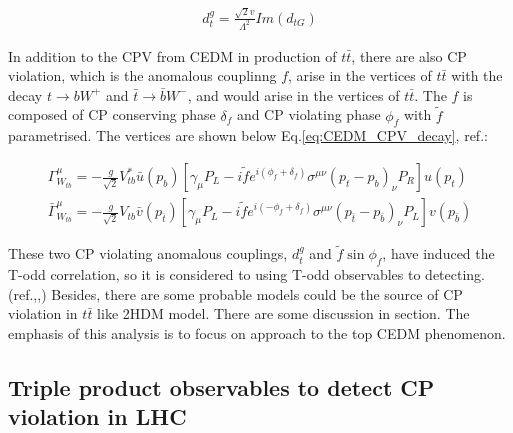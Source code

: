 	\begin{equation}
	\begin{split}
	d_t^g = \frac{\sqrt{2} v}{\Lambda^2} Im(d_{tG})
	\label{eq:CEDM_L_connection}
	\end{split}
	\end{equation}
	\FloatBarrier

	In addition to the CPV from CEDM in production of $t\bar{t}$, there are also CP violation, which is the anomalous couplinng $f$, arise in the vertices of $t\bar{t}$ with the decay $t \rightarrow bW^+$ and $\bar{t} \rightarrow \bar{b}W^-$, and would arise in the vertices of $t\bar{t}$. The $f$ is composed of CP conserving phase $\delta_f$ and CP violating phase $\phi_{f}$ with $\widetilde{f}$ parametrised. The vertices are shown below Eq.\ref{eq:CEDM_CPV_decay}, ref.\cite{PhysRevD.81.034013}:

	\begin{equation}
	\begin{split}
	\Gamma^{\mu}_{W_{tb}} = - \frac{g}{\sqrt{2}}V_{tb}^{*} \bar{u}(p_{b})[ \gamma_{\mu} P_{L} - i\widetilde{f}e^{i(\phi_f + \delta_f)} \sigma^{\mu \nu} (p_t - p_b)_{\nu} P_R ] u(p_t) \\
	\bar{\Gamma}^{\mu}_{W_{tb}} = - \frac{g}{\sqrt{2}}V_{tb} \bar{v}(p_{\bar{t}})[ \gamma_{\mu} P_{L} - i\widetilde{f}e^{i(-\phi_f + \delta_f)} \sigma^{\mu \nu} (p_{\bar{t}} - p_{\bar{b}})_{\nu} P_L ] v(p_{\bar{b}})
	\end{split}
	\label{eq:CEDM_CPV_decay}
	\end{equation}

	These two CP violating anomalous couplings, $d_t^g$ and $\widetilde{f} \sin{\phi_f}$, have induced the T-odd correlation, so it is considered to using T-odd observables to detecting.(ref.\cite{PhysRevD.81.034013},\cite{PhysRevD.79.013013},\cite{PhysRevD.80.034013}) Besides, there are some probable models could be the source of CP violation in $t\bar{t}$ like 2HDM model. There are some discussion in section. The emphasis of this analysis is to focus on approach to the top CEDM phenomenon.


	\subsection{Triple product observables to detect CP violation in LHC}
	\label{ssec:Intro_TPinLHC}


